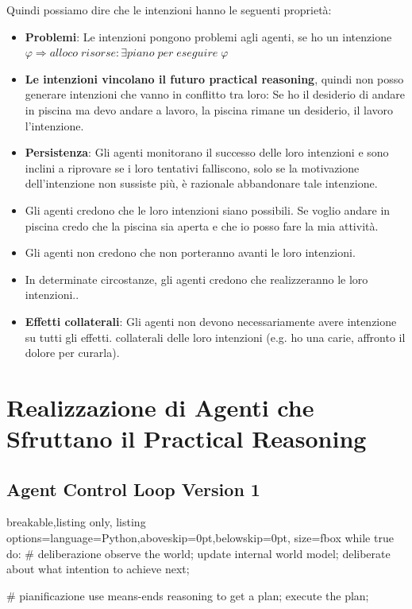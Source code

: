 Quindi possiamo dire che le intenzioni hanno le seguenti proprietà:
\begin{itemize}
    \item \textbf{Problemi}: Le intenzioni pongono problemi agli agenti, se ho un intenzione \begin{math} \varphi \Rightarrow alloco\;risorse : \exists piano \; per\;eseguire\;\varphi \end{math}
    \item \textbf{Le intenzioni vincolano il futuro practical reasoning}, quindi non posso generare intenzioni che vanno in conflitto tra loro: Se ho il desiderio di andare in piscina ma devo andare a lavoro, la piscina rimane un desiderio, il lavoro l'intenzione.
    \item \textbf{Persistenza}: Gli agenti monitorano il successo delle loro intenzioni e sono inclini a riprovare se i loro tentativi falliscono, solo se la motivazione dell’intenzione non sussiste più, è razionale abbandonare tale intenzione.
    \item Gli agenti credono che le loro intenzioni siano possibili. Se voglio andare in piscina credo che la piscina sia aperta e che io posso fare la mia attività.
    \item Gli agenti non credono che non porteranno avanti le loro intenzioni.
    \item In determinate circostanze, gli agenti credono che realizzeranno le loro intenzioni..
    \item \textbf{Effetti collaterali}: Gli agenti non devono necessariamente avere intenzione su tutti gli effetti.
collaterali delle loro intenzioni (e.g. ho una carie, affronto il dolore per curarla).
\end{itemize}

\section{Realizzazione di Agenti che Sfruttano il Practical Reasoning}

\subsection{Agent Control Loop Version 1}

\begin{tcblisting}{breakable,listing only, listing options={language=Python,aboveskip=0pt,belowskip=0pt}, size=fbox}
while true do:
    # deliberazione
    observe the world;
    update internal world model;
    deliberate about what intention to achieve next;
    
    # pianificazione
    use means-ends reasoning to get a plan;
    execute the plan;
\end{tcblisting}

